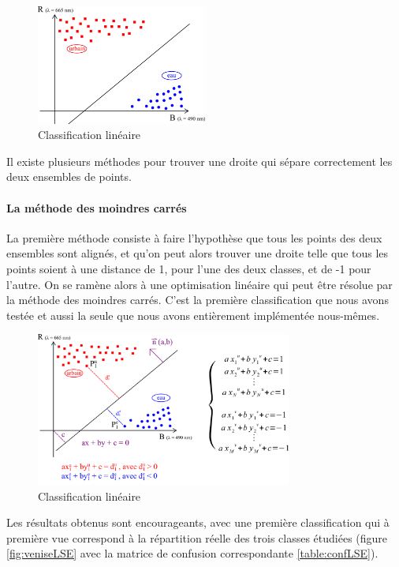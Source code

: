 \documentclass[a4paper,10pt]{article}
\begin{document}
\begin{figure}[H]
  \centering
    \includegraphics[width=0.5\textwidth]{ml_lin.png}
  \caption{Classification linéaire}
  \label{fig:ml_lin}
\end{figure}

Il existe plusieurs méthodes pour trouver une droite qui sépare correctement les deux ensembles de points.

\paragraph{La méthode des moindres carrés}
  La première méthode consiste à faire l'hypothèse que tous les points des deux ensembles sont alignés, et qu'on peut alors trouver une droite telle que tous les points soient à une distance de 1, pour l'une des deux classes, et de -1 pour l'autre. On se ramène alors à une optimisation linéaire qui peut être résolue par la méthode des moindres carrés.
  C'est la première classification que nous avons testée et aussi la seule que nous avons entièrement implémentée nous-mêmes. 
  
  \begin{figure}[H]
  \centering
    \includegraphics[width=0.75\textwidth]{ml_lse}
  \caption{Classification linéaire}
  \label{fig:ml_lse}
\end{figure}
  
\label{lineaire}
 Les résultats obtenus sont encourageants, avec une première classification qui à première vue correspond à la répartition réelle des trois classes étudiées (figure \ref{fig:veniseLSE} avec la matrice de confusion correspondante \ref{table:confLSE}).
\end{document}
